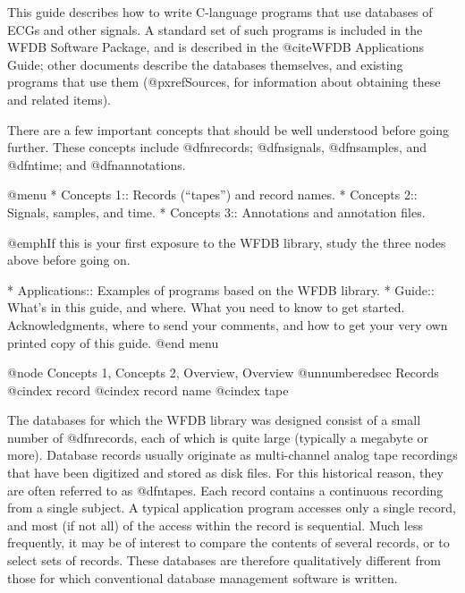 This guide describes how to write C-language programs that use databases
of ECGs and other signals.  A standard set of such programs is included
in the WFDB Software Package, and is described in the @cite{WFDB
Applications Guide}; other documents describe the databases themselves,
and existing programs that use them (@pxref{Sources}, for information
about obtaining these and related items).

There are a few important concepts that should be well understood before
going further.  These concepts include @dfn{records}; @dfn{signals},
@dfn{samples}, and @dfn{time}; and @dfn{annotations}.

@menu
* Concepts 1::			Records (``tapes'') and record names.
* Concepts 2::			Signals, samples, and time.
* Concepts 3::			Annotations and annotation files.

@emph{If this is your first exposure to the WFDB library,
study the three nodes above before going on.}

* Applications::		Examples of programs based on the WFDB library.
* Guide::			What's in this guide, and where.
                		What you need to know to get started.
				Acknowledgments, where to send your
				comments, and how to get your very own
				printed copy of this guide.
@end menu

@node     Concepts 1, Concepts 2, Overview, Overview
@unnumberedsec Records
@cindex record
@cindex record name
@cindex tape

The databases for which the WFDB library was designed consist of a small
number of @dfn{records}, each of which is quite large (typically a
megabyte or more).  Database records usually originate as multi-channel
analog tape recordings that have been digitized and stored as disk
files.  For this historical reason, they are often referred to as
@dfn{tapes}.  Each record contains a continuous recording from a single
subject.  A typical application program accesses only a single record,
and most (if not all) of the access within the record is sequential.
Much less frequently, it may be of interest to compare the contents of
several records, or to select sets of records.  These databases are
therefore qualitatively different from those for which conventional
database management software is written.

